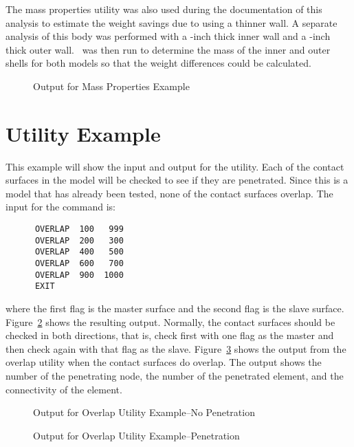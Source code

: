 The mass properties utility was also used during the documentation of
this analysis to estimate the weight savings due to using a thinner
wall.  A separate analysis of this body was performed with a
-inch thick inner wall and a -inch thick outer wall.
\numbers\ was then run to determine the mass of the inner and outer
shells for both models so that the weight differences could be
calculated.

\begin{figure}

\caption{Output for Mass Properties Example}\label{exmassout}
\end{figure}

\section{ Utility Example}
This example will show the input and output for the 
utility.  Each of the contact surfaces in the model will be checked to
see if they are penetrated.  Since this is a model that has already been
tested, none of the contact surfaces overlap.
The input for the command is:

\begin{verbatim}
      OVERLAP  100   999
      OVERLAP  200   300
      OVERLAP  400   500
      OVERLAP  600   700
      OVERLAP  900  1000
      EXIT
\end{verbatim}

where the first flag is the master surface and the second flag is the
slave surface. Figure~\ref{exoverlapout} shows the resulting output.
Normally, the contact surfaces should be checked in both directions,
that is, check first with one flag as the master and then check again
with that flag as the slave.  Figure~\ref{exoverlap2} shows the output
from the overlap utility when the contact surfaces do overlap.  The
output shows the number of the penetrating node, the number of the
penetrated element, and the connectivity of the element. 

\begin{figure}

\caption{Output for Overlap Utility Example--No
Penetration}\label{exoverlapout}
\end{figure}

\begin{figure}

\caption{Output for Overlap Utility
Example--Penetration}\label{exoverlap2} 
\end{figure}

